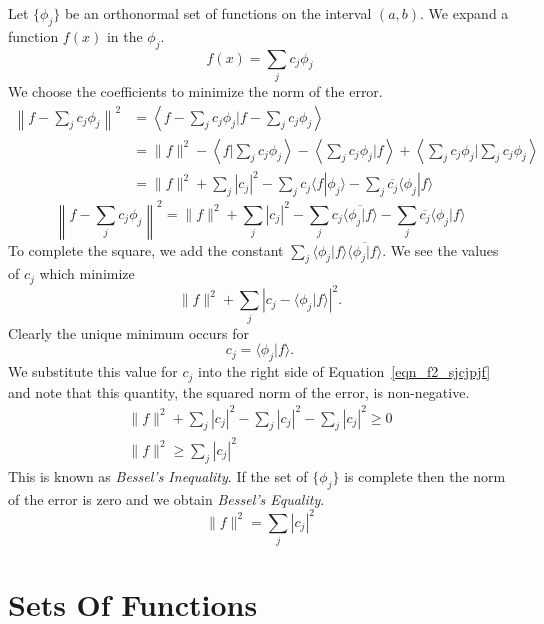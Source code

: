 Let $\{\phi_j\}$ be an orthonormal set of functions
on the interval $(a,b)$.  We expand a function $f(x)$ in the $\phi_j$.
\[
f(x) = \sum_j c_j \phi_j
\]
We choose the coefficients to minimize the norm of the error.
\begin{align*}
  \left\| f - \sum_j c_j \phi_j \right\|^2 
  &= \left\langle f - \sum_j c_j \phi_j \bigg| 
    f - \sum_j c_j \phi_j \right\rangle \\
  &= \| f \|^2 
  - \left\langle f \bigg| \sum_j c_j \phi_j \right\rangle
  - \left\langle \sum_j c_j \phi_j \bigg| f \right\rangle
  + \left\langle \sum_j c_j \phi_j \bigg| 
    \sum_j c_j \phi_j \right\rangle \\
  &= \| f \|^2 + \sum_j |c_j|^2
  - \sum_j c_j \langle f | \phi_j \rangle
  - \sum_j \overline{c_j} \langle \phi_j | f \rangle 
\end{align*}
\begin{equation}
  \label{eqn_f2_sjcjpjf}
  \left\| f - \sum_j c_j \phi_j \right\|^2 
  = \| f \|^2 + \sum_j |c_j|^2
  - \sum_j c_j \overline{\langle \phi_j | f \rangle}
  - \sum_j \overline{c_j} \langle \phi_j | f \rangle
\end{equation}
To complete the square, we add the constant 
$\sum_j \langle \phi_j | f \rangle \overline{ \langle \phi_j | f \rangle }$.
We see the values of $c_j$ which minimize
\[
\| f \|^2 + \sum_j \left| c_j - \langle \phi_j | f \rangle \right|^2.
\]
Clearly the unique minimum occurs for
\[
c_j = \langle \phi_j | f \rangle.
\]
We substitute this value for $c_j$ into the right side of 
Equation~\ref{eqn_f2_sjcjpjf} and note that this quantity, the squared norm
of the error, is non-negative.
\begin{gather*}
  \| f \|^2 + \sum_j |c_j|^2 - \sum_j |c_j|^2 - \sum_j |c_j|^2 \geq 0 \\
  \| f \|^2 \geq \sum_j |c_j|^2 
\end{gather*}
This is known as \textit{Bessel's Inequality}.  If the set of $\{\phi_j\}$ is 
complete then the norm of the error is zero and we obtain 
\textit{Bessel's Equality}.
\[
\| f \|^2 = \sum_j |c_j|^2 
\]






\section{Sets Of Functions}

